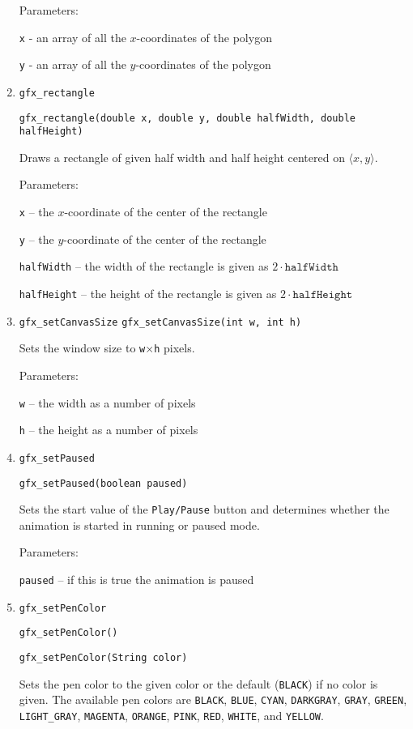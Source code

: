 \begin{enumerate}
      Parameters:

      \texttt{x} - an array of all the $x$-coordinates of the polygon

      \texttt{y} - an array of all the $y$-coordinates of the polygon
\item \texttt{gfx\_rectangle}

      \texttt{gfx\_rectangle(double x, double y, double halfWidth, double halfHeight)}

      Draws a rectangle of given half width and half height centered on $\langle x,y \rangle$.

      Parameters:

      \texttt{x} -- the $x$-coordinate of the center of the rectangle

      \texttt{y} -- the $y$-coordinate of the center of the rectangle

      \texttt{halfWidth} -- the width of the rectangle is given as $2 \cdot \mathtt{halfWidth}$

      \texttt{halfHeight} -- the height of the rectangle is given as $2 \cdot \mathtt{halfHeight}$
\item \texttt{gfx\_setCanvasSize}
      \texttt{gfx\_setCanvasSize(int w, int h)}

      Sets the window size to \texttt{w}$\times$\texttt{h} pixels.

      Parameters:
      
      \texttt{w} -- the width as a number of pixels 

      \texttt{h} -- the height as a number of pixels
\item \texttt{gfx\_setPaused}

      \texttt{gfx\_setPaused(boolean paused)}

      Sets the start value of the \texttt{Play/Pause} button and determines whether the animation 
      is started in running or paused mode.

      Parameters:

      \texttt{paused} -- if this is true the animation is paused
\item \texttt{gfx\_setPenColor}

      \texttt{gfx\_setPenColor()}

      \texttt{gfx\_setPenColor(String color)}

      Sets the pen color to the given color or the default (\texttt{BLACK}) if no color is given. 
      The available pen colors are \texttt{BLACK}, 
      \texttt{BLUE},
      \texttt{CYAN},
      \texttt{DARKGRAY},
      \texttt{GRAY},
      \texttt{GREEN},
      \texttt{LIGHT\_GRAY},
      \texttt{MAGENTA},
      \texttt{ORANGE},
      \texttt{PINK},
      \texttt{RED},
      \texttt{WHITE}, and 
      \texttt{YELLOW}.


\end{enumerate}
